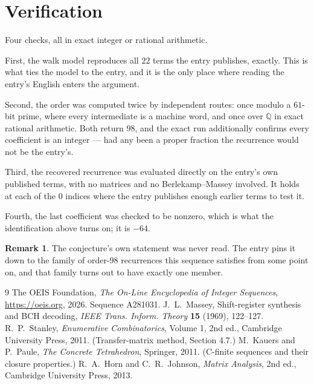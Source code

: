 \documentclass[11pt,a4paper]{article}
\theoremstyle{plain}
\theoremstyle{definition}
\newtheorem{remark}[theorem]{Remark}
\begin{document}
\section{Verification}

Four checks, all in exact integer or rational arithmetic.

First, the walk model reproduces all $22$ terms the entry publishes, exactly. This is
what ties the model to the entry, and it is the only place where reading the entry's English
enters the argument.

Second, the order was computed twice by independent routes: once modulo a $61$-bit prime, where
every intermediate is a machine word, and once over $\mathbb{Q}$ in exact rational arithmetic.
Both return $98$, and the exact run additionally confirms every coefficient is an integer
--- had any been a proper fraction the recurrence would not be the entry's.

Third, the recovered recurrence was evaluated directly on the entry's own published terms, with
no matrices and no Berlekamp--Massey involved. It holds at each of the $0$ indices where
the entry publishes enough earlier terms to test it.

Fourth, the last coefficient was checked to be nonzero, which is what the identification above
turns on; it is $-64$.

\begin{remark}
The conjecture's own statement was never read. The entry pins it down to the family of
order-$98$ recurrences this sequence satisfies from some point on, and that family turns
out to have exactly one member.
\end{remark}

\begin{thebibliography}{9}
 The OEIS Foundation, \emph{The On-Line Encyclopedia of Integer
Sequences}, \url{https://oeis.org}, 2026. Sequence A281031.
 J.~L.~Massey, Shift-register synthesis and BCH decoding, \emph{IEEE
Trans. Inform. Theory} \textbf{15} (1969), 122--127.
 R.~P.~Stanley, \emph{Enumerative Combinatorics}, Volume 1, 2nd ed.,
Cambridge University Press, 2011. (Transfer-matrix method, Section 4.7.)
 M.~Kauers and P.~Paule, \emph{The Concrete Tetrahedron}, Springer, 2011.
(C-finite sequences and their closure properties.)
 R.~A.~Horn and C.~R.~Johnson, \emph{Matrix Analysis}, 2nd ed., Cambridge
University Press, 2013.
\end{thebibliography}
\end{document}
